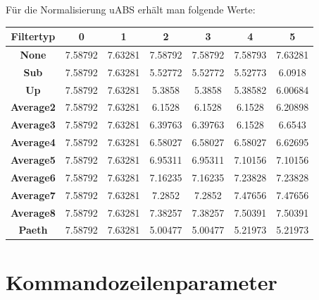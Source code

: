 \documentclass[a4paper,12pt]{article}
\begin{document}
Für die Normalisierung uABS erhält man folgende Werte:
\par
\vspace{1cm}
\begin{tabular}{c | c | c | c | c | c | c}
Filtertyp & 0 &  1 & 2 & 3 & 4 & 5
\\
\hline
\textbf{None} &  7.58792 & 7.63281 & 7.58792 & 7.58792  & 7.58793 &  7.63281
\\
\textbf{Sub} & 7.58792 &   7.63281 & 5.52772 &  5.52772 &  5.52773   & 6.0918
\\
\textbf{Up} & 7.58792 &  7.63281 & 5.3858 & 5.3858  &  5.38582  &  6.00684 
\\
\textbf{Average2} & 7.58792 &  7.63281 & 6.1528 & 6.1528 & 6.1528  & 6.20898
\\
\textbf{Average3} & 7.58792 &  7.63281 & 6.39763 & 6.39763 & 6.1528 & 6.6543 
\\
\textbf{Average4} & 7.58792 &  7.63281 & 6.58027 & 6.58027 & 6.58027  & 6.62695 
\\
\textbf{Average5} & 7.58792 &  7.63281 & 6.95311 & 6.95311 & 7.10156 &  7.10156 
\\
\textbf{Average6} & 7.58792 &  7.63281 & 7.16235 & 7.16235 & 7.23828 &  7.23828 
\\
\textbf{Average7} & 7.58792 &  7.63281 & 7.2852 &  7.2852 & 7.47656   &  7.47656
\\
\textbf{Average8} & 7.58792 &  7.63281 & 7.38257 &  7.38257  & 7.50391  & 7.50391
\\
\textbf{Paeth} & 7.58792 &  7.63281 & 5.00477 &   5.00477  & 5.21973  & 5.21973 
\end{tabular}


\newpage
\section{Kommandozeilenparameter}
\newpage
\listoffigures
\newpage
\end{document}

